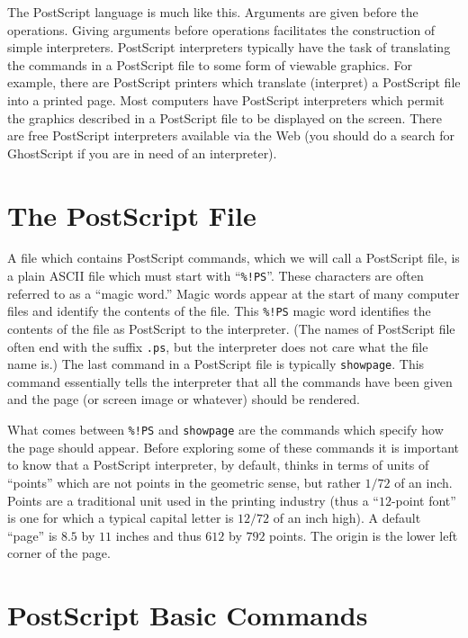 The PostScript language is much like this.  Arguments are given before
the operations.  Giving arguments before operations facilitates the
construction of simple interpreters.  PostScript interpreters
typically have the task of translating the commands in a PostScript
file to some form of viewable graphics.  For example, there are
PostScript printers which translate (interpret) a PostScript file into
a printed page.  Most computers have PostScript interpreters which
permit the graphics described in a PostScript file to be displayed on
the screen.  There are free PostScript interpreters available via the
Web (you should do a search for GhostScript if you are in need of an
interpreter).

\section{The PostScript File}

A file which contains PostScript commands, which we will call a
PostScript file, is a plain ASCII file which must start with
``\verb+%!PS+''.  These characters are often referred to as a ``magic
word.''  Magic words appear at the start of many computer files and
identify the contents of the file.  This \verb+%!PS+ magic word
identifies the contents of the file as PostScript to the interpreter.
(The names of PostScript file often end with the suffix {\tt .ps}, but
the interpreter does not care what the file name is.)  The last
command in a PostScript file is typically {\tt showpage}.  This
command essentially tells the interpreter that all the commands have
been given and the page (or screen image or whatever) should be
rendered.

What comes between \verb+%!PS+ and {\tt showpage} are the commands
which specify how the page should appear.  Before exploring some of
these commands it is important to know that a PostScript interpreter,
by default, thinks in terms of units of ``points'' which are not
points in the geometric sense, but rather $1/72$ of an inch.  Points
are a traditional unit used in the printing industry (thus a
``$12$-point font'' is one for which a typical capital letter is
$12/72$ of an inch high).  A default ``page'' is $8.5$ by $11$ inches
and thus $612$ by $792$ points.  The origin is the lower left corner
of the page.

\section{PostScript Basic Commands}

